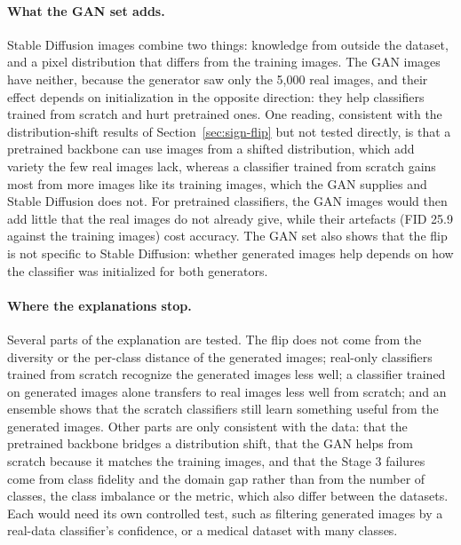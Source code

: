 \paragraph{What the GAN set adds.}
Stable Diffusion images combine two things: knowledge from outside the dataset, and a pixel distribution that
differs from the training images. The GAN images have neither, because the generator saw only the 5{,}000 real
images, and their effect depends on initialization in the opposite direction: they help classifiers trained from
scratch and hurt pretrained ones. One reading, consistent with the distribution-shift results of
Section~\ref{sec:sign-flip} but not tested directly, is that a pretrained backbone can use images from a shifted
distribution, which add variety the few real images lack, whereas a classifier trained from scratch gains most
from more images like its training images, which the GAN supplies and Stable Diffusion does not. For pretrained
classifiers, the GAN images would then add little that the real images do not already give, while their artefacts
(FID 25.9 against the training images) cost accuracy. The GAN set also shows that the flip is not specific to
Stable Diffusion: whether generated images help depends on how the classifier was initialized for both
generators.

\paragraph{Where the explanations stop.}
Several parts of the explanation are tested. The flip does not come from the diversity or the per-class distance
of the generated images; real-only classifiers trained from scratch recognize the generated images less well; a
classifier trained on generated images alone transfers to real images less well from scratch; and an ensemble
shows that the scratch classifiers still learn something useful from the generated images. Other parts are only
consistent with the data: that the pretrained backbone bridges a distribution shift, that the GAN helps from
scratch because it matches the training images, and that the Stage 3 failures come from class fidelity and the
domain gap rather than from the number of classes, the class imbalance or the metric, which also differ between
the datasets. Each would need its own controlled test, such as filtering generated images by a real-data
classifier's confidence, or a medical dataset with many classes.
